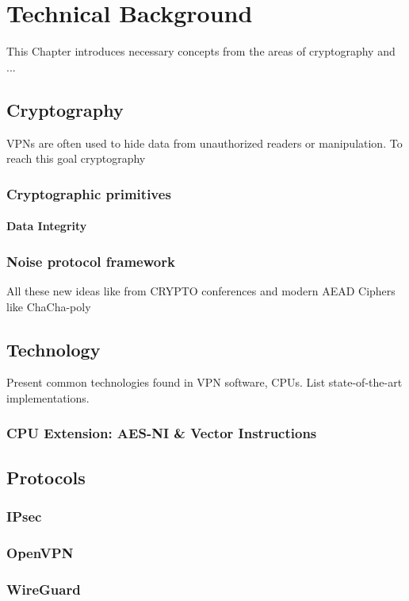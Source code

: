 \chapter{Technical Background}
\label{chap:background}

This Chapter introduces necessary concepts from the areas of cryptography and ...

\section{Cryptography}

VPNs are often used to hide data from unauthorized readers or manipulation. To reach this goal cryptography 

\subsection{Cryptographic primitives}

\subsubsection{Data Integrity}

\subsection{Noise protocol framework}
All these new ideas like from CRYPTO conferences and modern AEAD Ciphers like ChaCha-poly

\section{Technology}
Present common technologies found in VPN software, CPUs. List state-of-the-art implementations.
\subsection{CPU Extension: AES-NI \& Vector Instructions}

\section{Protocols}
\subsection{IPsec}
\cite{ferguson1999cryptographic}
\subsection{OpenVPN}

\subsection{WireGuard}
\cite{donenfeld2017wireguard}
\cite{dowling2018cryptographic}